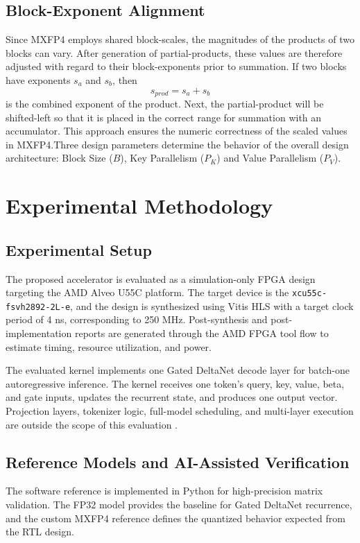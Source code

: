 ﻿\documentclass[conference]{IEEEtran}
\begin{document}
\subsection{Block-Exponent Alignment}
Since MXFP4 employs shared block-scales, the magnitudes of the products of two blocks can vary. After generation of partial-products, these values are therefore adjusted with regard to their block-exponents prior to summation. If two blocks have exponents $s_a$ and $s_b$, then
\begin{equation}
s_{prod} = s_a + s_b
\end{equation}
is the combined exponent of the product. Next, the partial-product will be shifted-left so that it is placed in the correct range for summation with an accumulator. This approach ensures the numeric correctness of the scaled values in MXFP4.Three design parameters determine the behavior of the overall design architecture: Block Size ($B$), Key Parallelism ($P_K$) and Value Parallelism ($P_V$).

\section{Experimental Methodology}

\subsection{Experimental Setup}
The proposed accelerator is evaluated as a simulation-only FPGA design targeting the AMD Alveo U55C platform. The target device is the \texttt{xcu55c-fsvh2892-2L-e}, and the design is synthesized using Vitis HLS with a target clock period of 4 ns, corresponding to 250 MHz. Post-synthesis and post-implementation reports are generated through the AMD FPGA tool flow to estimate timing, resource utilization, and power.

The evaluated kernel implements one Gated DeltaNet decode layer for batch-one autoregressive inference. The kernel receives one token's query, key, value, beta, and gate inputs, updates the recurrent state, and produces one output vector. Projection layers, tokenizer logic, full-model scheduling, and multi-layer execution are outside the scope of this evaluation \cite{b3,b10}.

\subsection{Reference Models and AI-Assisted Verification}
The software reference is implemented in Python for high-precision matrix validation. The FP32 model provides the baseline for Gated DeltaNet recurrence, and the custom MXFP4 reference defines the quantized behavior expected from the RTL design.
\end{document}
